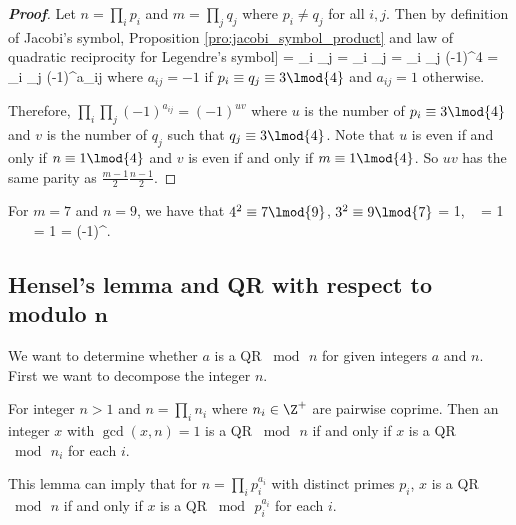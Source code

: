 \begin{proof}[\bf Proof]
Let $n = \prod_i p_i$ and $m = \prod_j q_j$ where $p_i \neq q_j$ for all $i,j$. Then by definition of Jacobi's symbol, Proposition \ref{pro:jacobi_symbol_product} and law of quadratic reciprocity for Legendre's symbol]\label{thm:law_of_quadratic_reciprocity_legendre_symbol}
\be
{} = \prod_i  \prod_j  = \prod_i \prod_j   = \prod_i \prod_j (-1)^{4} = \prod_i \prod_j (-1)^{a_{ij}}
\ee
where $a_{ij} =-1$ if $p_i \equiv q_j\equiv 3\lmod{4}$ and $a_{ij} = 1$ otherwise.

Therefore, $\prod_i\prod_j (-1)^{a_{ij}} = (-1)^{uv}$ where $u$ is the number of $p_i \equiv 3\lmod{4}$ and $v$ is the number of $q_j$ such that $q_j\equiv 3\lmod{4}$. Note that $u$ is even if and only if $n\equiv 1 \lmod{4}$ and $v$ is even if and only if $m\equiv 1 \lmod{4}$. So $uv$ has the same parity as $\frac{m-1}2\frac{n-1}2$.
\end{proof}


\begin{example}
For $m= 7$ and $n = 9$, we have that $4^2 \equiv 7\lmod{9}$, $3^2 \equiv 9\lmod{7}$
\be
{} = 1, \  = 1 \ \ra\ \   = 1 = (-1)^{}.
\ee
\end{example}


\subsection{Hensel's lemma and QR with respect to modulo $\mathbf{n}$}

We want to determine whether $a$ is a QR $\bmod\, n$ for given integers $a$ and $n$. First we want to decompose the integer $n$.

\begin{lemma}\label{lem:qr_product_iff_qr_coprime_factor}
For integer $n>1$ and $n = \prod_i n_i$ where $n_i\in \Z^+$ are pairwise coprime. Then an integer $x$ with $\gcd(x,n)=1$ is a QR $\bmod\, n$ if and only if $x$ is a QR $\bmod\, n_i$ for each $i$.
\end{lemma}

\begin{remark}
This lemma can imply that for $n = \prod_i p_i^{a_i}$ with distinct primes $p_i$, $x$ is a QR $\bmod\, n$ if and only if $x$ is a QR $\bmod\, p_i^{a_i}$ for each $i$.
\end{remark}

